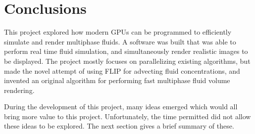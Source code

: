 \chapter{Conclusions}
\label{chapter conclusions}

This project explored how modern GPUs can be programmed to efficiently simulate and render multiphase fluids. A software was built that was able to perform real time fluid simulation, and simultaneously render realistic images to be displayed. The project mostly focuses on parallelizing existing algorithms, but made the novel attempt of using FLIP for advecting fluid concentrations, and invented an original algorithm for performing fast multiphase fluid volume rendering. 

During the development of this project, many ideas emerged which would all bring more value to this project. Unfortunately, the time permitted did not allow these ideas to be explored. The next section gives a brief summary of these.

